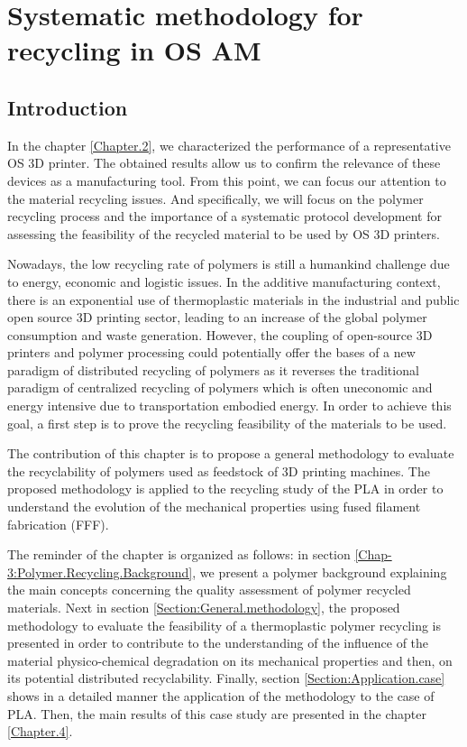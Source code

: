 \chapter{Systematic methodology for recycling in OS AM }
\label{Chapter.3}
\minitoc

\afterpage{
	\pagestyle{empty}
	\newpage~\newpage
}

\newpage
	
\section{Introduction}

In the chapter \ref{Chapter.2}, we characterized the performance of a representative OS 3D printer.
The obtained results allow us to confirm the relevance of these devices as  a manufacturing tool.
From this point, we can focus our attention to the material recycling issues.
And specifically,  we will focus on the polymer recycling process and the importance  of a systematic protocol development for assessing the feasibility of the recycled material to be used by OS 3D printers.

Nowadays, the low recycling rate of polymers is still a humankind challenge due to energy, economic and logistic issues. 
In the additive manufacturing context, there is an exponential use of thermoplastic materials in the industrial and public open source 3D printing sector, leading to an increase of the global polymer consumption and waste generation.   
However, the coupling of open-source 3D printers and polymer processing could potentially offer the bases of a new paradigm of distributed recycling of polymers as it reverses the traditional paradigm of centralized recycling of polymers which is often uneconomic and energy intensive due to transportation embodied energy.
In order to achieve this goal, a first step is to prove the recycling feasibility of the materials to be used. 

The contribution of this chapter is to propose a general methodology to evaluate the recyclability of polymers used as feedstock of 3D printing machines. 
The proposed methodology is applied to the recycling study of the PLA in order to understand the evolution of the mechanical properties using fused filament fabrication (FFF).  


The reminder of the chapter is organized as follows: in section \ref{Chap-3:Polymer.Recycling.Background},  we present a polymer background explaining the main concepts  concerning the quality assessment of polymer recycled materials.  
Next in section \ref{Section:General.methodology}, the proposed methodology to evaluate the feasibility of a thermoplastic polymer recycling is presented in order to contribute to the understanding of the influence of the material physico-chemical degradation on its mechanical properties and then, on its potential distributed recyclability.  
Finally,  section \ref{Section:Application.case} shows in a detailed manner the application of the methodology to the case of PLA. 
Then, the main results of this case study are presented in the chapter \ref{Chapter.4}.

